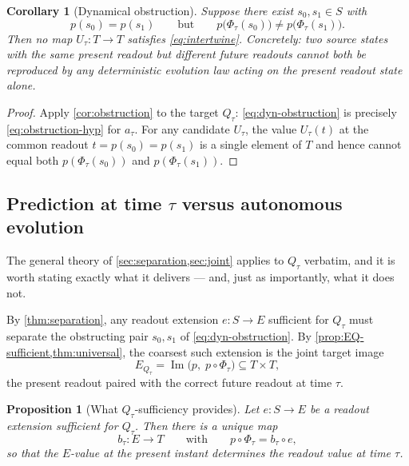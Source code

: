 \documentclass[11pt,reqno]{amsart}
\theoremstyle{plain}
\newtheorem{proposition}[theorem]{Proposition}
\newtheorem{corollary}[theorem]{Corollary}
\theoremstyle{definition}
\newcommand{\Src}{S}
\newcommand{\Rdt}{T}
\newcommand{\Img}{\operatorname{Im}}
\begin{document}
\begin{corollary}[Dynamical obstruction]\label{cor:dynamical-obstruction}
Suppose there exist $s_0,s_1\in\Src$ with
\begin{equation}\label{eq:dyn-obstruction}
p(s_0)=p(s_1)
\qquad\text{but}\qquad
p\bigl(\Phi_\tau(s_0)\bigr)\neq p\bigl(\Phi_\tau(s_1)\bigr).
\end{equation}
Then no map $U_\tau\colon\Rdt\to\Rdt$ satisfies \eqref{eq:intertwine}. Concretely: two source
states with the \emph{same present readout} but \emph{different future readouts} cannot both be
reproduced by any deterministic evolution law acting on the present readout state alone.
\end{corollary}

\begin{proof}
Apply \cref{cor:obstruction} to the target $Q_\tau$: \eqref{eq:dyn-obstruction} is precisely
\eqref{eq:obstruction-hyp} for $a_\tau$. For any candidate $U_\tau$, the value
$U_\tau(t)$ at the common readout $t=p(s_0)=p(s_1)$ is a single element of $\Rdt$ and hence
cannot equal both $p(\Phi_\tau(s_0))$ and $p(\Phi_\tau(s_1))$.
\end{proof}

\subsection{Prediction at time \texorpdfstring{$\tau$}{tau} versus autonomous evolution}
\label{subsec:predict-vs-evolve}

The general theory of \cref{sec:separation,sec:joint} applies to $Q_\tau$ verbatim, and it is
worth stating exactly what it delivers --- and, just as importantly, what it does not.

By \cref{thm:separation}, any readout extension $e\colon\Src\to E$ sufficient for $Q_\tau$ must
separate the obstructing pair $s_0,s_1$ of \eqref{eq:dyn-obstruction}. By
\cref{prop:EQ-sufficient,thm:universal}, the coarsest such extension is the joint target image
\begin{equation}\label{eq:EQtau}
E_{Q_\tau}=\Img\bigl(p,\;p\circ\Phi_\tau\bigr)\subseteq\Rdt\times\Rdt,
\end{equation}
the present readout paired with the correct future readout at time $\tau$.

\begin{proposition}[What $Q_\tau$-sufficiency provides]\label{prop:qtau-provides}
Let $e\colon\Src\to E$ be a readout extension sufficient for $Q_\tau$. Then there is a unique map
\begin{equation}\label{eq:btau}
b_\tau\colon E\longrightarrow\Rdt
\qquad\text{with}\qquad
p\circ\Phi_\tau=b_\tau\circ e ,
\end{equation}
so that the $E$-value at the present instant determines the readout value at time $\tau$.
\end{proposition}
\end{document}
